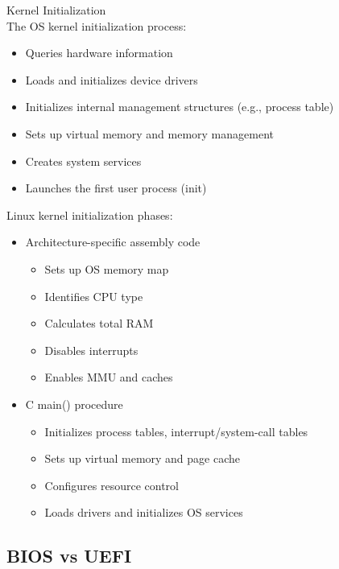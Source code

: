 \begin{definition}{Kernel Initialization}\\
    The OS kernel initialization process:
    \begin{itemize}
        \item Queries hardware information 
        \item Loads and initializes device drivers
        \item Initializes internal management structures (e.g., process table)
        \item Sets up virtual memory and memory management
        \item Creates system services
        \item Launches the first user process (init)
    \end{itemize}
    
    Linux kernel initialization phases:
    \begin{itemize}
        \item Architecture-specific assembly code
            \begin{itemize}
                \item Sets up OS memory map
                \item Identifies CPU type
                \item Calculates total RAM
                \item Disables interrupts
                \item Enables MMU and caches
            \end{itemize}
        \item C main() procedure
            \begin{itemize}
                \item Initializes process tables, interrupt/system-call tables
                \item Sets up virtual memory and page cache
                \item Configures resource control
                \item Loads drivers and initializes OS services
            \end{itemize}
    \end{itemize}
\end{definition}

\subsection{BIOS vs UEFI}


